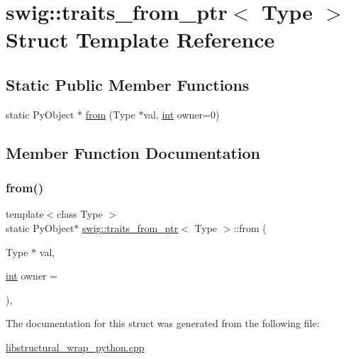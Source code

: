 \hypertarget{structswig_1_1traits__from__ptr}{}\section{swig\+:\+:traits\+\_\+from\+\_\+ptr$<$ Type $>$ Struct Template Reference}
\label{structswig_1_1traits__from__ptr}
\subsection*{Static Public Member Functions}
\begin{DoxyCompactItemize}
\item 
static Py\+Object $\ast$ \hyperlink{structswig_1_1traits__from__ptr_a02f758f7fd32a799a85cf3509940ff02}{from} (Type $\ast$val, \hyperlink{lp__lib_8h_adeb9ec6400320e4923ac9d836d509ddb}{int} owner=0)
\end{DoxyCompactItemize}


\subsection{Member Function Documentation}
\mbox{\label{structswig_1_1traits__from__ptr_a02f758f7fd32a799a85cf3509940ff02}} 
\subsubsection{\texorpdfstring{from()}{from()}}
{\footnotesize\ttfamily template$<$class Type $>$ \\
static Py\+Object$\ast$ \hyperlink{structswig_1_1traits__from__ptr}{swig\+::traits\+\_\+from\+\_\+ptr}$<$ Type $>$\+::from (\begin{DoxyParamCaption}\item[{Type $\ast$}]{val,  }\item[{\hyperlink{lp__lib_8h_adeb9ec6400320e4923ac9d836d509ddb}{int}}]{owner = {} }\end{DoxyParamCaption})\hspace{0.3cm}{\ttfamily [inline]}, {\ttfamily [static]}}



The documentation for this struct was generated from the following file\+:\begin{DoxyCompactItemize}
\item 
\hyperlink{libstructural__wrap__python_8cpp}{libstructural\+\_\+wrap\+\_\+python.\+cpp}\end{DoxyCompactItemize}
